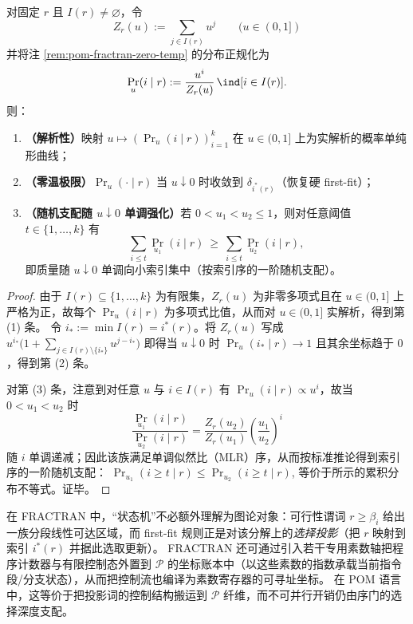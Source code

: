 \begin{proposition}\label{prop:pom-fractran-soft-firstfit-analytic-dominance}
对固定 \(r\) 且 \(I(r)\neq\varnothing\)，令
\[
Z_r(u):=\sum_{j\in I(r)}u^{j}\qquad(u\in(0,1])
\]
并将注 \ref{rem:pom-fractran-zero-temp} 的分布正规化为
\[
\Pr_u(i\mid r):=\frac{u^{i}}{Z_r(u)}\,\ind[i\in I(r)].
\]
则：
\begin{enumerate}
  \item \textbf{（解析性）}映射 \(u\mapsto (\Pr_u(i\mid r))_{i=1}^{k}\) 在 \(u\in(0,1]\) 上为实解析的概率单纯形曲线；
  \item \textbf{（零温极限）}\(\Pr_u(\cdot\mid r)\) 当 \(u\downarrow 0\) 时收敛到 \(\delta_{i^\ast(r)}\)（恢复硬 first-fit）；
  \item \textbf{（随机支配随 \(u\downarrow 0\) 单调强化）}若 \(0<u_1<u_2\le 1\)，则对任意阈值 \(t\in\{1,\dots,k\}\) 有
  \[
  \sum_{i\le t}\Pr_{u_1}(i\mid r)\ \ge\ \sum_{i\le t}\Pr_{u_2}(i\mid r),
  \]
  即质量随 \(u\downarrow 0\) 单调向小索引集中（按索引序的一阶随机支配）。
\end{enumerate}
\end{proposition}
\begin{proof}
由于 \(I(r)\subseteq\{1,\dots,k\}\) 为有限集，\(Z_r(u)\) 为非零多项式且在 \(u\in(0,1]\) 上严格为正，故每个 \(\Pr_u(i\mid r)\) 为多项式比值，从而对 \(u\in(0,1]\) 实解析，得到第 (1) 条。
令 \(i_\ast:=\min I(r)=i^\ast(r)\)。将 \(Z_r(u)\) 写成 \(u^{i_\ast}\bigl(1+\sum_{j\in I(r)\setminus\{i_\ast\}}u^{j-i_\ast}\bigr)\) 即得当 \(u\downarrow 0\) 时 \(\Pr_u(i_\ast\mid r)\to 1\) 且其余坐标趋于 \(0\)，得到第 (2) 条。
\par
对第 (3) 条，注意到对任意 \(u\) 与 \(i\in I(r)\) 有 \(\Pr_u(i\mid r)\propto u^{i}\)，故当 \(0<u_1<u_2\) 时
\[
\frac{\Pr_{u_1}(i\mid r)}{\Pr_{u_2}(i\mid r)}
=
\frac{Z_r(u_2)}{Z_r(u_1)}\left(\frac{u_1}{u_2}\right)^{i}
\]
随 \(i\) 单调递减；因此该族满足单调似然比（MLR）序，从而按标准推论得到索引序的一阶随机支配：
\(
\Pr_{u_1}(i\ge t\mid r)\le \Pr_{u_2}(i\ge t\mid r)
\),
等价于所示的累积分布不等式。证毕。
\end{proof}




\begin{remark}\label{rem:pom-fractran-controlflow}
在 FRACTRAN 中，“状态机”不必额外理解为图论对象：可行性谓词 \(r\ge \beta_i\) 给出一族分段线性可达区域，而 first-fit 规则正是对该分解上的\emph{选择投影}（把 \(r\) 映射到索引 \(i^\ast(r)\) 并据此选取更新）。
FRACTRAN 还可通过引入若干专用素数轴把程序计数器与有限控制态外置到 \(\mathcal{P}\) 的坐标账本中（以这些素数的指数承载当前指令段/分支状态），从而把控制流也编译为素数寄存器的可寻址坐标。
在 POM 语言中，这等价于把投影词的控制结构搬运到 \(\mathcal{P}\) 纤维，而不可并行开销仍由序门的选择深度支配。
\end{remark}

